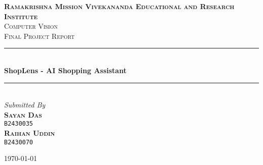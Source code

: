 \begin{titlepage}
	\newcommand{\HRule}{\rule{\linewidth}{0.5mm}}
	\center


	\textsc{\LARGE \textbf{Ramakrishna Mission Vivekananda Educational and Research Institute}}\\[1.5cm]

	\textsc{\LARGE Computer Vision}\\[0.5cm]

	\textsc{\large Final Project Report}\\[0.5cm]

	\HRule\\[0.4cm]

	{\huge\bfseries ShopLens - AI Shopping Assistant}\\[0.4cm]

	\HRule\\[1.5cm]



\large
\textit{Submitted By}\\
\textsc{\textbf{Sayan Das }}\\
\vspace{-0.5em}
\textsc{\texttt{B2430035 }}\\
\textsc{\textbf{Raihan Uddin }}\\
\vspace{-0.5em}
\textsc{\texttt{B2430070 }}\\



	\vfill\vfill\vfill

	{\large \today}

	\vfill

\end{titlepage}
\restoregeometry